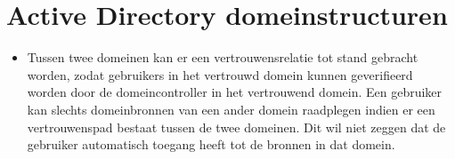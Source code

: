 	\section{Active Directory domeinstructuren }
	\begin{enumerate}
		 {
			\begin{itemize}
				\item Tussen twee domeinen kan er een vertrouwensrelatie tot stand gebracht worden, zodat gebruikers in het vertrouwd domein kunnen geverifieerd worden door de domeincontroller in het vertrouwend domein. Een gebruiker kan slechts domeinbronnen van een ander domein raadplegen indien er een vertrouwenspad bestaat tussen de twee domeinen. Dit wil niet zeggen dat de gebruiker automatisch toegang heeft tot de bronnen in dat domein.
			\end{itemize}
		}
		

\end{enumerate}
